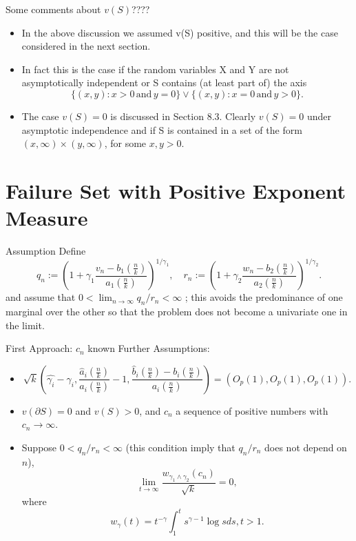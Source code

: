 \documentclass[11pt]{beamer}
\begin{document}
\begin{frame}{Some comments about $v(S)$????}
\begin{itemize}
\item In the above discussion we assumed v(S) positive, and this will be the case considered in the next section.
\item In fact this is the case
if the random variables X and Y are not asymptotically independent or S contains (at
least part of) the axis
\begin{equation}\tag{8.1.12}
\{ (x,y):x>0 \, \text{and} \, y=0\} \lor \{ (x,y):x=0 \, \text{and} \, y>0\}.
\end{equation}
\item The case $v(S)=0$ is discussed in Section 8.3. Clearly $v(S)=0$ under asymptotic
independence and if S is contained in a set of the form $(x,\infty) \times (y,\infty)$, for some $x,y>0$.
\end{itemize}
\end{frame}

\section{Failure Set with Positive Exponent Measure}
\begin{frame}{Assumption}
 Define
\begin{displaymath}
q_n:=(1+\gamma_1 \frac{v_n-b_1(\frac{n}{k})}{a_1(\frac{n}{k})})^{1/\gamma_1},\quad r_n:=(1+\gamma_2 \frac{w_n-b_2(\frac{n}{k})}{a_2(\frac{n}{k})})^{1/\gamma_2}.
\end{displaymath}
and assume that $0<\lim_{n\to \infty} q_n/r_n<\infty$  ; this avoids the predominance of
one marginal over the other so that the problem does not become a univariate one in
the limit.
\end{frame}



\begin{frame}{First Approach: $c_n$ known}
Further Assumptions:
\begin{itemize}
\item 
\begin{displaymath}
\sqrt{k}(\hat{\gamma_i}-\gamma_i, \frac{\hat{a}_i(\frac{n}{k})}{a_i(\frac{n}{k})}-1, \dfrac{\hat{b}_i(\frac{n}{k})-b_i(\frac{n}{k})}{a_i(\frac{n}{k})})=(O_p(1),O_p(1),O_p(1)).
\end{displaymath}
\item $v(\partial S)=0$ and $v(S)>0$, and $c_n$ a sequence of positive numbers with $c_n\to \infty$.
\item Suppose $0<q_n/r_n<\infty$ (this condition imply that $q_n/r_n$ does not depend on $n$),
\begin{equation}\tag{8.2.5}
\lim_{t\to \infty} \frac{w_{\gamma_1 \land \gamma_2}(c_n)}{\sqrt{k}}=0,
\end{equation}
where
\begin{displaymath}
w_{\gamma}(t)=t^{-\gamma}\int_{1}^t s^{\gamma-1}\log s ds, t>1.
\end{displaymath}
\end{itemize}
\end{frame}
\end{document}
